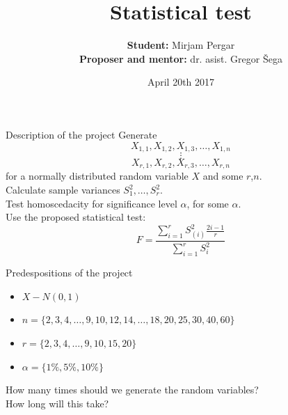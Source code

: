 \documentclass{beamer}
\title[Statistical test]
{Statistical test}
\author[Mirjam Pergar]
{\textbf{Student:}  Mirjam Pergar\\
\textbf{Proposer and mentor:} dr. asist. Gregor Šega
}
\institute[Fakuleta za matematiko in fiziko]
\date[April 20th 2017] %
{April 20th 2017}
\begin{document}
\begin{frame}
\titlepage
\end{frame}

\begin{frame}{Description of the project}
Generate 
$$X_{1,1}, X_{1,2},X_{1,3}, \dots , X_{1,n}$$
$$\vdots$$
$$X_{r,1}, X_{r,2}, X_{r,3}, \dots, X_{r,n}$$
for a normally distributed random variable $X$ and some $r$,$n$.\\
Calculate sample variances $S^2_{1}, \dots, S^2_{r}$.\\
Test homoscedacity for significance level $\alpha$, for some $\alpha$.\\
Use the proposed statistical test: $$F =\frac{ \sum_{i=1}^{r} S^2_{(i)} \frac{2i-1}{r}}{\sum_{i=1}^{r} S^2_{i}}$$

\end{frame}

\begin{frame}{Predespositions of the project}
\begin{itemize}
\item $X-N(0,1)$
\item $n = \{2,3,4,\dots, 9,10,12,14,\dots, 18,20,25,30,40,60\}$
\item $r = \{2,3,4, \dots ,9,10,15,20\}$
\item $\alpha = \{1\%,5\%,10\%\}$
\end{itemize}
\pause
How many times should we generate the random variables?\\
How long will this take?

\end{frame}
\end{document}
